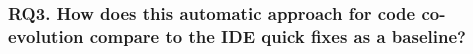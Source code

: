 \subsubsection{RQ3. How does this automatic approach for code co-evolution compare to the IDE quick fixes as a baseline?}

